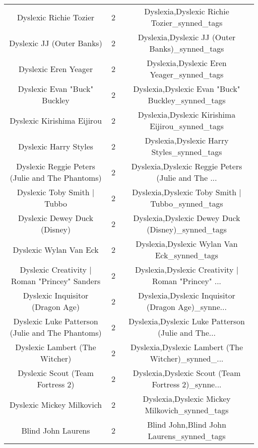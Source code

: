 \begin{table}[h!]
{\begin{tabular}{|c|c|c|}
                            Dyslexic Richie Tozier &          2 &        Dyslexia,Dyslexic Richie Tozier\_synned\_tags \\
                         Dyslexic JJ (Outer Banks) &          2 &     Dyslexia,Dyslexic JJ (Outer Banks)\_synned\_tags \\
                              Dyslexic Eren Yeager &          2 &          Dyslexia,Dyslexic Eren Yeager\_synned\_tags \\
                      Dyslexic Evan "Buck" Buckley &          2 &  Dyslexia,Dyslexic Evan "Buck" Buckley\_synned\_tags \\
                        Dyslexic Kirishima Eijirou &          2 &    Dyslexia,Dyslexic Kirishima Eijirou\_synned\_tags \\
                             Dyslexic Harry Styles &          2 &         Dyslexia,Dyslexic Harry Styles\_synned\_tags \\
   Dyslexic Reggie Peters (Julie and The Phantoms) &          2 & Dyslexia,Dyslexic Reggie Peters (Julie and The ... \\
                       Dyslexic Toby Smith | Tubbo &          2 &   Dyslexia,Dyslexic Toby Smith | Tubbo\_synned\_tags \\
                      Dyslexic Dewey Duck (Disney) &          2 &  Dyslexia,Dyslexic Dewey Duck (Disney)\_synned\_tags \\
                            Dyslexic Wylan Van Eck &          2 &        Dyslexia,Dyslexic Wylan Van Eck\_synned\_tags \\
     Dyslexic Creativity | Roman "Princey" Sanders &          2 & Dyslexia,Dyslexic Creativity | Roman "Princey" ... \\
                  Dyslexic Inquisitor (Dragon Age) &          2 & Dyslexia,Dyslexic Inquisitor (Dragon Age)\_synne... \\
  Dyslexic Luke Patterson (Julie and The Phantoms) &          2 & Dyslexia,Dyslexic Luke Patterson (Julie and The... \\
                    Dyslexic Lambert (The Witcher) &          2 & Dyslexia,Dyslexic Lambert (The Witcher)\_synned\_... \\
                  Dyslexic Scout (Team Fortress 2) &          2 & Dyslexia,Dyslexic Scout (Team Fortress 2)\_synne... \\
                         Dyslexic Mickey Milkovich &          2 &     Dyslexia,Dyslexic Mickey Milkovich\_synned\_tags \\
                                Blind John Laurens &          2 &          Blind John,Blind John Laurens\_synned\_tags \\

\end{tabular}}
\end{table}
